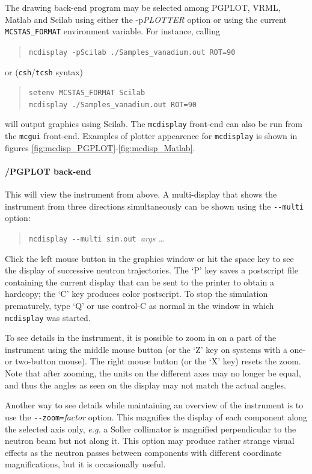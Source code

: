    
The drawing back-end program may be selected among PGPLOT, VRML, Matlab and Scilab using either the -p{\it PLOTTER} option or using the current \verb+MCSTAS_FORMAT+ environment variable. 
For instance, calling
\begin{quote}
  \verb+mcdisplay -pScilab ./Samples_vanadium.out ROT=90+
\end{quote}
or (\verb+csh+/\verb+tcsh+ syntax)
\begin{quote}
  \verb+setenv MCSTAS_FORMAT Scilab+\\
  \verb+mcdisplay ./Samples_vanadium.out ROT=90+
\end{quote}
will output graphics using Scilab.
The \verb+mcdisplay+ front-end can also be run from the \verb+mcgui+ front-end.
Examples of plotter appearence for \verb+mcdisplay+ is shown in figures
 \ref{fig:mcdisp_PGPLOT}-\ref{fig:mcdisp_Matlab}.

\paragraph{\MCS /PGPLOT back-end}

This will view the instrument from above. A
multi-display that shows the instrument from three directions
simultaneously can be shown using the \verb+--multi+ option:
\begin{quote}
  \verb+mcdisplay --multi sim.out +{\it args \ldots}
\end{quote}

Click the left mouse button in the graphics window or hit the space key
to see the display of successive neutron trajectories. The `P' key saves
a postscript file containing the current display that can be sent to the
printer to obtain a hardcopy; the `C' key produces color postscript.
To stop the simulation
prematurely, type `Q' or use control-C as normal in the window in which
\verb+mcdisplay+ was started.

To see details in the instrument, it is possible to zoom in on a part of
the instrument using the middle mouse button (or the `Z' key on systems
with a one- or two-button mouse). The right mouse button (or the `X'
key) resets the zoom. Note that after zooming, the units on the
different axes may no longer be equal, and thus the angles as seen on
the display may not match the actual angles.

Another way to see details while maintaining an overview of the
instrument is to use the \verb+--zoom=+\textit{factor} option. This
magnifies the display of each component along the selected axis only,
{\em e.g.} a Soller collimator is magnified perpendicular to the neutron beam
but not along it. This option may produce rather strange visual effects
as the neutron passes between components with different coordinate
magnifications, but it is occasionally useful.

